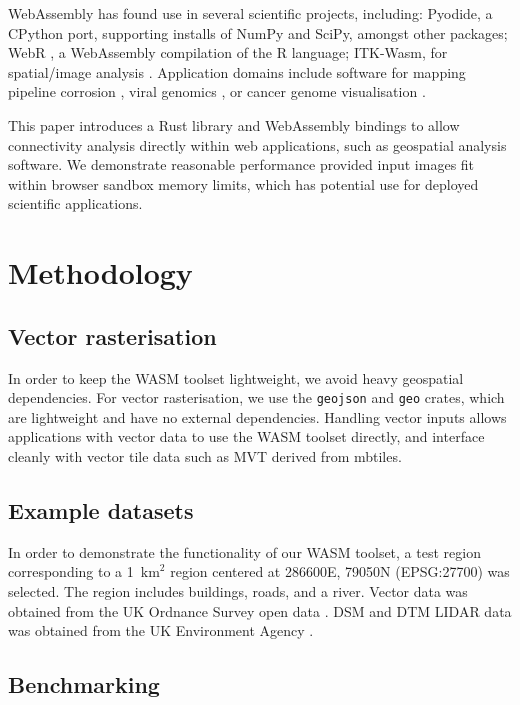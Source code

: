 \documentclass[11pt, a4paper]{article}
\begin{document}
WebAssembly has found use in several scientific projects, including: Pyodide, a CPython port, supporting installs of NumPy and SciPy, amongst other packages\cite{pyodide2026};
WebR \cite{webr2026}, a WebAssembly compilation of the R language; ITK-Wasm, for spatial/image analysis \cite{itkwasm2026}. 
Application domains include software for mapping pipeline corrosion \cite{guarneri2024web}, viral genomics \cite{ji2024viralwasm}, or cancer genome visualisation \cite{finney2018chromatic}.


This paper introduces a Rust library and WebAssembly bindings to allow connectivity analysis directly within web applications,
such as geospatial analysis software. We demonstrate reasonable
 performance provided input images fit within browser sandbox memory limits,
 which has potential use for deployed scientific applications.

\section{Methodology}

\subsection{Vector rasterisation}

In order to keep the WASM toolset lightweight, we avoid heavy geospatial dependencies. For vector rasterisation, we use
the \texttt{geojson} and \texttt{geo} crates, which are lightweight and have no external dependencies. Handling vector inputs allows
applications with vector data to use the WASM toolset directly, and interface cleanly with vector tile
data such as MVT derived from mbtiles.

\subsection{Example datasets}

In order to demonstrate the functionality of our WASM toolset, a test region corresponding to a 1~$\text{km}^2$ region centered at
286600E, 79050N (EPSG:27700) was selected. The region includes buildings, roads, and a river. Vector data was obtained from
the UK Ordnance Survey open data \cite{os_data}. 
DSM and DTM LIDAR data was obtained from the UK Environment Agency \cite{ea_lidar_composite_2022}.

\subsection{Benchmarking}
\end{document}
